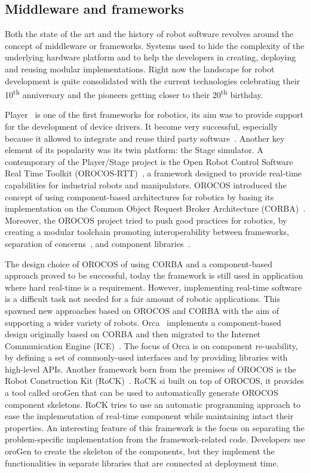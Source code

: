 \subsection{Middleware and frameworks}
Both the state of the art and the history of robot software revolves around the concept of middleware or frameworks. Systems used to hide the complexity of the underlying hardware platform and to help the developers in creating, deploying and reusing modular implementations. Right now the landscape for robot development is quite consolidated with the current technologies celebrating their 10\textsuperscript{th} anniversary and the pioneers getting closer to their 20\textsuperscript{th} birthday.

Player~\cite{gerkey2003player} is one of the first frameworks for robotics, its aim was to provide support for the development of device drivers. It become very successful, especially because it allowed to integrate and reuse third party software~\cite{vaughan2007reusable}. Another key element of its popularity was its twin platform: the Stage simulator. A contemporary of the Player/Stage project is the Open Robot Control Software Real Time Toolkit (OROCOS-RTT)~\cite{bruyninckx2001open}, a framework designed to provide real-time capabilities for industrial robots and manipulators. OROCOS introduced the concept of using component-based architectures for robotics by basing its implementation on the Common Object Request Broker Architecture (CORBA)~\cite{otte1996understanding}. Moreover, the OROCOS project tried to push good practices for robotics, by creating a modular toolchain promoting interoperability between frameworks, separation of concerns~\cite{bruyninckx2003real}, and component libraries~\cite{bruyninckx2002orocos}.

The design choice of OROCOS of using CORBA and a component-based approach proved to be successful, today the framework is still used in application where hard real-time is a requirement. However, implementing real-time software is a difficult task not needed for a fair amount of robotic applications. This spawned new approaches based on OROCOS and CORBA with the aim of supporting a wider variety of robots. Orca~\cite{brooks2007orca} implements a component-based design originally based on CORBA and then migrated to the Internet Communication Engine (ICE)~\cite{ICE}. The focus of Orca is on component re-usability, by defining a set of commonly-used interfaces and by providing libraries with high-level APIs. Another framework born from the premises of OROCOS is the Robot Construction Kit (RoCK)~\cite{joyeux2011robot}. RoCK si built on top of OROCOS, it provides a tool called oroGen that can be used to automatically generate OROCOS component skeletons. RoCK tries to use an automatic programming approach to ease the implementation of real-time component while maintaining intact their properties. An interesting feature of this framework is the focus on separating the problem-specific implementation from the framework-related code. Developers use oroGen to create the skeleton of the components, but they implement the functionalities in separate libraries that are connected at deployment time.

